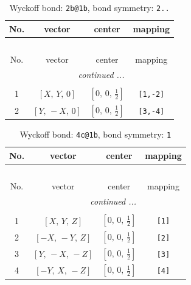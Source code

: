 \documentclass[fleqn,8pt]{jsarticle}
\begin{document}
\begin{longtable}{cccc}
\caption{Wyckoff bond: {\tt 2b@1b}, bond symmetry: {\tt 2..}}
 \\
 \hline \hline
No. & vector & center & mapping \\ \hline \endfirsthead

\multicolumn{3}{l}{\tablename\ \thetable{}} \\
 \hline \hline
No. & vector & center & mapping \\ \hline \endhead

 \hline \hline
\multicolumn{3}{r}{\footnotesize\it continued ...} \\ \endfoot

 \hline \hline
\multicolumn{3}{r}{} \\ \endlastfoot

1 & $\left[ X,\, Y,\, 0 \right]$ & $\left[ 0,\, 0,\, \frac{1}{2} \right]$ & {\tt [1,-2]} \\ \hline
2 & $\left[ Y,\, - X,\, 0 \right]$ & $\left[ 0,\, 0,\, \frac{1}{2} \right]$ & {\tt [3,-4]} \\
\end{longtable}
\renewcommand{\arraystretch}{1.2}
\begin{longtable}{cccc}
\caption{Wyckoff bond: {\tt 4c@1b}, bond symmetry: {\tt 1}}
 \\
 \hline \hline
No. & vector & center & mapping \\ \hline \endfirsthead

\multicolumn{3}{l}{\tablename\ \thetable{}} \\
 \hline \hline
No. & vector & center & mapping \\ \hline \endhead

 \hline \hline
\multicolumn{3}{r}{\footnotesize\it continued ...} \\ \endfoot

 \hline \hline
\multicolumn{3}{r}{} \\ \endlastfoot

1 & $\left[ X,\, Y,\, Z \right]$ & $\left[ 0,\, 0,\, \frac{1}{2} \right]$ & {\tt [1]} \\ \hline
2 & $\left[ - X,\, - Y,\, Z \right]$ & $\left[ 0,\, 0,\, \frac{1}{2} \right]$ & {\tt [2]} \\ \hline
3 & $\left[ Y,\, - X,\, - Z \right]$ & $\left[ 0,\, 0,\, \frac{1}{2} \right]$ & {\tt [3]} \\ \hline
4 & $\left[ - Y,\, X,\, - Z \right]$ & $\left[ 0,\, 0,\, \frac{1}{2} \right]$ & {\tt [4]} \\
\end{longtable}
\end{document}
